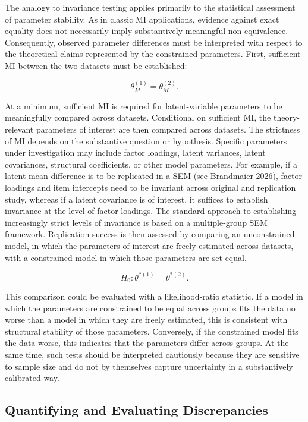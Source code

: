 \documentclass[
  12pt,
  letterpaper,
  man]{apa7}
\begin{document}
The analogy to invariance testing applies primarily to the statistical
assessment of parameter stability. As in classic MI applications,
evidence against exact equality does not necessarily imply substantively
meaningful non-equivalence. Consequently, observed parameter differences
must be interpreted with respect to the theoretical claims represented
by the constrained parameters. First, sufficient MI between the two
datasets must be established:

\[\theta_M^{(1)} = \theta_M^{(2)}. \]

At a minimum, sufficient MI is required for latent-variable parameters
to be meaningfully compared across datasets. Conditional on sufficient
MI, the theory-relevant parameters of interest are then compared across
datasets. The strictness of MI depends on the substantive question or
hypothesis. Specific parameters under investigation may include factor
loadings, latent variances, latent covariances, structural coefficients,
or other model parameters. For example, if a latent mean difference is
to be replicated in a SEM (see Brandmaier 2026), factor loadings and
item intercepts need to be invariant across original and replication
study, whereas if a latent covariance is of interest, it suffices to
establish invariance at the level of factor loadings. The standard
approach to establishing increasingly strict levels of invariance is
based on a multiple-group SEM framework. Replication success is then
assessed by comparing an unconstrained model, in which the parameters of
interest are freely estimated across datasets, with a constrained model
in which those parameters are set equal.

\[ H_0: \theta^{*(1)} = \theta^{*(2)}. \]

This comparison could be evaluated with a likelihood-ratio statistic. If
a model in which the parameters are constrained to be equal across
groups fits the data no worse than a model in which they are freely
estimated, this is consistent with structural stability of those
parameters. Conversely, if the constrained model fits the data worse,
this indicates that the parameters differ across groups. At the same
time, such tests should be interpreted cautiously because they are
sensitive to sample size and do not by themselves capture uncertainty in
a substantively calibrated way.

\subsection{Quantifying and Evaluating
Discrepancies}\label{quantifying-and-evaluating-discrepancies}
\end{document}
